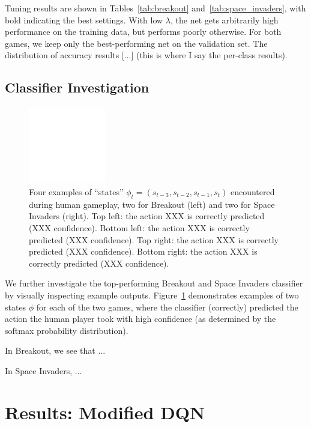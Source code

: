 \documentclass[letterpaper, 10pt, conference]{ieeeconf}
\begin{document}
Tuning results are shown in Tables~\ref{tab:breakout}
and~\ref{tab:space_invaders}, with bold indicating the best settings. With low
$\lambda$, the net gets arbitrarily high performance on the training data, but
performs poorly otherwise. For both games, we keep only the best-performing net
on the validation set.
The distribution of accuracy results [...] (this is where I say
the per-class results).

\subsection{Classifier Investigation}

\begin{figure}[t]
\centering
\includegraphics[width=0.30\textwidth]{figures/empty.png}
\caption{\footnotesize
Four examples of ``states'' $\phi_t = (s_{t-3},s_{t-2},s_{t-1},s_t)$ encountered
during human gameplay, two for Breakout (left) and two for Space Invaders
(right). Top left: the action XXX is correctly predicted (XXX confidence).
Bottom left: the action XXX is correctly predicted (XXX confidence). Top right:
the action XXX is correctly predicted (XXX confidence). Bottom right: the action
XXX is correctly predicted (XXX confidence).
}
\label{fig:example_game_frames}
\end{figure}

We further investigate the top-performing Breakout and Space Invaders classifier
by visually inspecting example outputs. Figure~\ref{fig:example_game_frames}
demonstrates examples of two states $\phi$ for each of the two games, where the
classifier (correctly) predicted the action the human player took with high
confidence (as determined by the softmax probability distribution).

In Breakout, we see that ...

In Space Invaders, ...




\section{Results: Modified DQN}\label{sec:results_p2}
\end{document}
